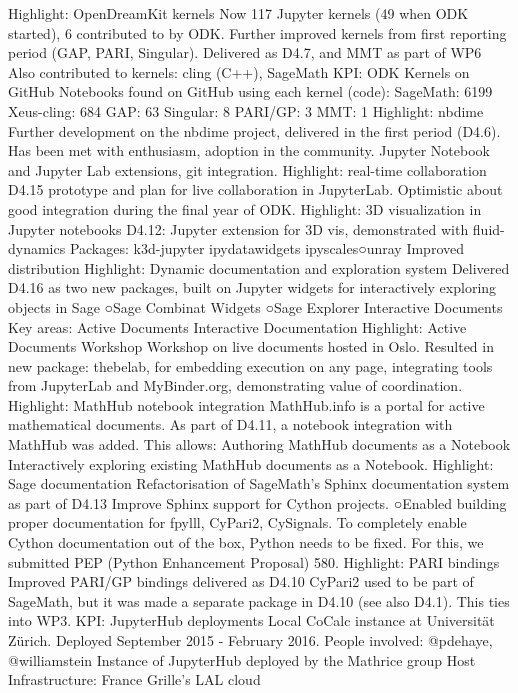 \begin{Aim 1}
\begin{Aim 2}
Highlight: OpenDreamKit kernels
Now 117 Jupyter kernels (49 when ODK started), 6 contributed to by ODK.
Further improved kernels from first reporting period (GAP, PARI, Singular). 
Delivered as D4.7, and MMT as part of WP6
Also contributed to kernels: cling (C++), SageMath
KPI: ODK Kernels on GitHub
Notebooks found on GitHub using each kernel (code):
SageMath: 6199
Xeus-cling: 684
GAP: 63
Singular: 8
PARI/GP: 3
MMT: 1
Highlight: nbdime
Further development on the nbdime project, delivered in the first period 
(D4.6). Has been met with enthusiasm, adoption in the community.
Jupyter Notebook and Jupyter Lab extensions, git integration.
Highlight: real-time collaboration
D4.15 prototype and plan for live collaboration in JupyterLab.
Optimistic about good integration during the final year of ODK.
Highlight: 3D visualization in Jupyter notebooks
D4.12: Jupyter extension for 3D vis, demonstrated with fluid-dynamics
Packages:
k3d-jupyter
ipydatawidgets
ipyscales○unray
Improved distribution
Highlight: Dynamic documentation and exploration system
Delivered D4.16 as two new packages, 
built on Jupyter widgets for interactively 
exploring objects in Sage
○Sage Combinat Widgets
○Sage Explorer
Interactive Documents
Key areas:
Active Documents
Interactive Documentation
Highlight: Active Documents Workshop
Workshop on live documents hosted in Oslo. Resulted in new package: 
thebelab, for embedding execution on any page, integrating tools from 
JupyterLab and MyBinder.org, demonstrating value of coordination.
Highlight: MathHub notebook integration
MathHub.info is a portal for active mathematical documents. As part of D4.11, a 
notebook integration with MathHub was added. This allows:
Authoring MathHub documents as a Notebook
Interactively exploring existing MathHub documents as a Notebook.
Highlight: Sage documentation
Refactorisation of SageMath’s Sphinx documentation system as part of D4.13
Improve Sphinx support for Cython projects.
○Enabled building proper documentation for fpylll, CyPari2, CySignals.
To completely enable Cython documentation out of the box, Python needs to 
be fixed. For this, we submitted PEP (Python Enhancement Proposal) 580.
Highlight: PARI bindings
Improved PARI/GP bindings delivered as D4.10
CyPari2 used to be part of SageMath, but it was made a separate package in 
D4.10 (see also D4.1). This ties into WP3.
KPI: JupyterHub deployments
Local CoCalc instance at Universität Zürich.
Deployed September 2015 - February 2016.
People involved: @pdehaye, @williamstein
Instance of JupyterHub
 deployed by the 
Mathrice group
Host Infrastructure: France Grille's LAL cloud

\end{Aim 2}
\end{Aim 1}
